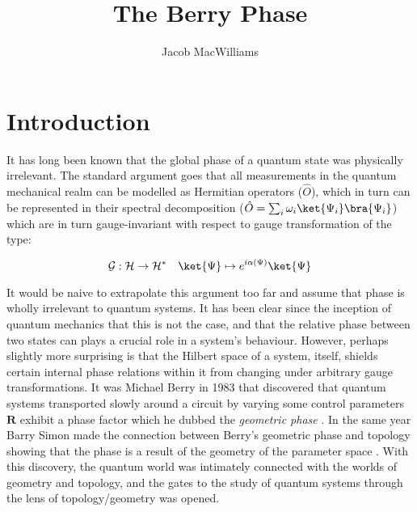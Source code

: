 \documentclass{article}
\title{The Berry Phase}
\author{Jacob MacWilliams}
\begin{document}
\maketitle
\tableofcontents

\newpage
\section{Introduction \label{sec:intro}}

It has long been known that the global phase of a quantum state was physically irrelevant. The standard argument goes that all measurements in the quantum mechanical realm can be modelled as Hermitian operators ($\hat{O}$), which in turn can be represented in their spectral decomposition ($\hat{O} = \sum_{i} \omega_{i}\ket{\Psi_i}\bra{\Psi_i}$) which are in turn gauge-invariant with respect to gauge transformation of the type:

\begin{equation*}
  \mathcal{G}: \mathcal{H} \rightarrow \mathcal{H}^{*} \quad  \ket{\Psi} \mapsto e^{i\alpha(\Psi)}\ket{\Psi}
\end{equation*}

It would be naive to extrapolate this argument too far and assume that phase is wholly irrelevant to quantum systems. It has been clear since the inception of quantum mechanics that this is not the case, and that the relative phase between two states can plays a crucial role in a system's behaviour. However, perhaps slightly more surprising is that the Hilbert space of a system, itself, shields certain internal phase relations within it from changing under arbitrary gauge transformations. It was Michael Berry in 1983 that discovered that quantum systems transported slowly around a circuit by varying some control parameters $\bm{R}$ exhibit a phase factor which he dubbed the \textit{geometric phase} \cite{Berry1984}. In the same year Barry Simon made the connection between Berry's geometric phase and topology showing that the phase is a result of the geometry of the parameter space \cite{Simon1983}. With this discovery, the quantum world was intimately connected with the worlds of geometry and topology, and the gates to the study of quantum systems through the lens of topology/geometry was opened.\\
\end{document}
